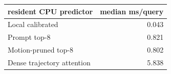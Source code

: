 \begin{tabular}{@{}lr@{}}
\toprule
resident CPU predictor & median ms/query \\
\midrule
Local calibrated & 0.043 \\
Prompt top-8 & 0.821 \\
Motion-pruned top-8 & 0.802 \\
Dense trajectory attention & 5.838 \\
\bottomrule
\end{tabular}
